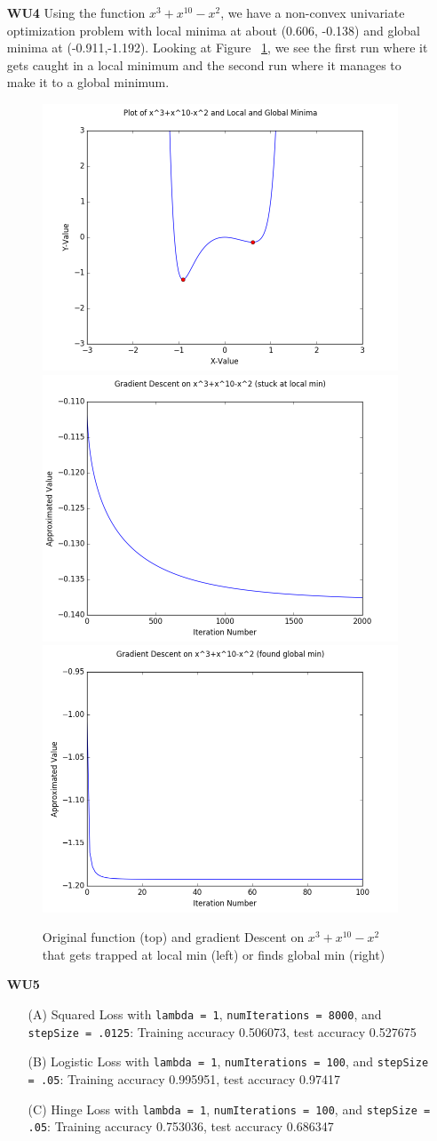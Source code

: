 \documentclass{article}
\begin{document}
\begin{enumerate}
	\item[\textbf{WU4}] 
Using the function $x^3+x^{10}-x^2$, we have a non-convex univariate optimization problem with local minima at about (0.606, -0.138) and global minima at (-0.911,-1.192). Looking at Figure ~\ref{fig:WU3}, we see the first run where it gets caught in a local minimum and the second run  where it manages to make it to a global minimum.

\begin{figure}[htp]
\centering
\includegraphics[width=.5\textwidth]{gd_graph.png}
\includegraphics[width=.5\textwidth]{gd_local_min.png}\hfill
\includegraphics[width=.5\textwidth]{gd_global_min.png}\hfill
\caption{Original function (top) and gradient Descent on $x^3+x^{10}-x^2$ that gets trapped at local min (left) or finds global min (right)}
\label{fig:WU3}
\end{figure}

	\item[\textbf{WU5}] 
	
	\begin{enumerate}
		\item[(A)] Squared Loss with \texttt{lambda = 1}, \texttt{numIterations = 8000}, and \texttt{stepSize = .0125}: Training accuracy 0.506073, test accuracy 0.527675
		\item[(B)] Logistic Loss with \texttt{lambda = 1}, \texttt{numIterations = 100}, and \texttt{stepSize = .05}: Training accuracy 0.995951, test accuracy 0.97417
		\item[(C)] Hinge Loss with \texttt{lambda = 1}, \texttt{numIterations = 100}, and \texttt{stepSize = .05}: Training accuracy 0.753036, test accuracy 0.686347 
		

\end{enumerate}
\end{enumerate}
\end{document}

